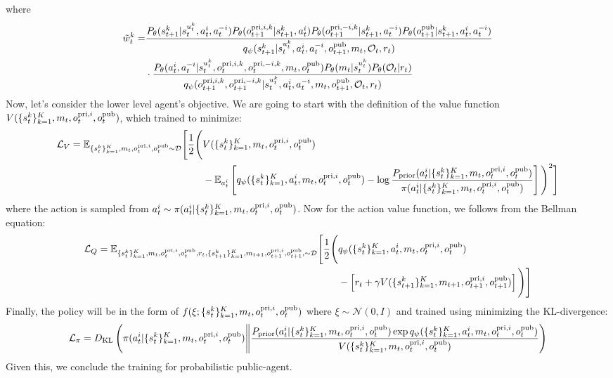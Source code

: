 where 
\begin{equation}
\begin{aligned}
    \tilde{w}_t^k = &\frac{P_\theta(s_{t+1}^k | s_t^{u^k_t}, a_t^i, a_t^{-i})P_\theta(o^{\operatorname{pri}, i, k}_{t+1} | s_{t+1}^k, a^i_t) P_\theta(o^{\operatorname{pri}, -i, k}_{t+1} | s_{t+1}^k, a^{-i}_t) P_\theta(o^{\operatorname{pub}}_{t+1} | s_{t+1}^k, a^i_t, a^{-i}_t)}{q_\psi(s_{t+1}^k | s_t^{u^k_t}, a^i_t, a^{-i}_t, o^{\operatorname{pub}}_{t+1}, m_t, \mathcal{O}_t, r_t)} \\
    &\cdot \frac{P_\theta(a^i_t, a^{-i}_t | s_t^{u^k_t}, o^{\operatorname{pri}, i, k}_t, o^{\operatorname{pri}, -i, k}_t, m_t, o^{\operatorname{pub}}_t) P_\theta(m_t | s_t^{u^k_t}) P_\theta(\mathcal{O}_t | r_t)}{q_\psi(o^{\operatorname{pri}, i, k}_{t+1}, o^{\operatorname{pri}, -i, k}_{t+1} | s_t^{u^k_t}, a^i_t, a^{-i}_t, m_t, o^{\operatorname{pub}}_{t+1}, \mathcal{O}_t, r_t)} 
\end{aligned}
\end{equation}
Now, let's consider the lower level agent's objective. We are going to start with the definition of the value function $V(\{s_t^k\}^K_{k=1}, m_t, o^{\operatorname{pri}, i}_t, o^{\operatorname{pub}}_t)$, which trained to minimize:
\begin{equation}
\begin{aligned}
\mathcal{L}_{V} = \mathbb{E}_{\{s_t^k\}^K_{k=1}, m_t, o^{\operatorname{pri}, i}_t, o^{\operatorname{pub}}_t\sim \mathcal{D}} \Bigg[\frac{1}{2}\Bigg(&V(\{s_t^k\}^K_{k=1}, m_t, o^{\operatorname{pri}, i}_t, o^{\operatorname{pub}}_t) \\
&- \mathbb{E}_{a_t^i}\left[ q_\psi(\{s_t^k\}^K_{k=1}, a^i_t, m_t, o^{\operatorname{pri}, i}_t, o^{\operatorname{pub}}_t) - \log \frac{P_{\text{prior}}(a^i_t | \{s_t^k\}^K_{k=1}, m_t, o^{\operatorname{pri}, i}_t, o^{\operatorname{pub}}_t)}{\pi(a^i_t | \{s_t^k\}^K_{k=1}, m_t, o^{\operatorname{pri}, i}_t, o^{\operatorname{pub}}_t)} \right]\Bigg)^2\Bigg]
\end{aligned}
\end{equation}
where the action is sampled from $a^i_t \sim \pi(a^i_t | \{s_t^k\}^K_{k=1}, m_t, o^{\operatorname{pri}, i}_t, o^{\operatorname{pub}}_t)$. Now for the action value function, we follows from the Bellman equation:
\begin{equation}
\begin{aligned}
    \mathcal{L}_Q = \mathbb{E}_{\{s_t^k\}^K_{k=1}, m_t, o^{\operatorname{pri}, i}_t, o^{\operatorname{pub}}_t, r_t, \{s_{t+1}^k\}^K_{k=1},m_{t+1}, o^{\operatorname{pri}, i}_{t+1}, o^{\operatorname{pub}}_{t+1},\sim \mathcal{D}}\Bigg[\frac{1}{2}\Bigg( &q_\psi(\{s_t^k\}^K_{k=1}, a^i_t, m_t, o^{\operatorname{pri}, i}_t, o^{\operatorname{pub}}_t)  \\
    &- \left[ r_t + \gamma V(\{s_{t+1}^k\}^K_{k=1}, m_{t+1}, o^{\operatorname{pri}, i}_{t+1}, o^{\operatorname{pub}}_{t+1}) \right] \Bigg)\Bigg]
\end{aligned}
\end{equation}
Finally, the policy will be in the form of $f(\xi ; \{s_t^k\}^K_{k=1}, m_t, o^{\operatorname{pri}, i}_t, o^{\operatorname{pub}}_t)$ where $\xi \sim \mathcal{N}(0, I)$ and trained using minimizing the KL-divergence:
\begin{equation}
    \mathcal{L}_{\pi} = D_{\mathrm{KL}}\left( \pi(a^i_t | \{s_t^k\}^K_{k=1}, m_t, o^{\operatorname{pri}, i}_t, o^{\operatorname{pub}}_t)\Bigg\|\frac{P_{\text{prior}}(a^i_t | \{s_t^k\}^K_{k=1}, m_t, o^{\operatorname{pri}, i}_t, o^{\operatorname{pub}}_t)\exp{q_\psi(\{s_t^k\}^K_{k=1}, a^i_t, m_t, o^{\operatorname{pri}, i}_t, o^{\operatorname{pub}}_t)}}{V(\{s_t^k\}^K_{k=1}, m_t, o^{\operatorname{pri}, i}_t, o^{\operatorname{pub}}_t)} \right)
\end{equation}
Given this, we conclude the training for probabilistic public-agent.
    
